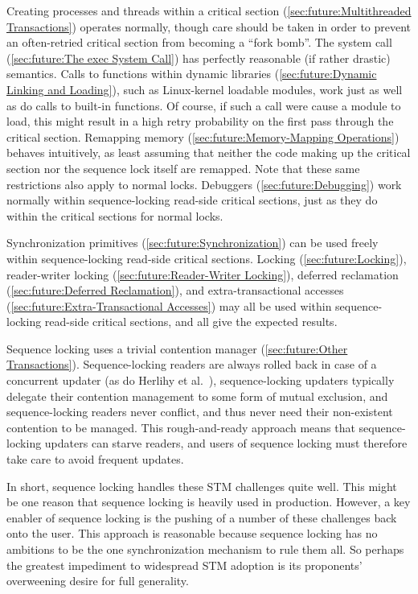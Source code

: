 Creating processes and threads within a critical section
(\cref{sec:future:Multithreaded Transactions})
operates normally, though care should be taken in order to prevent
an often-retried critical section from becoming a ``fork bomb''.
The  system call (\cref{sec:future:The exec System Call})
has perfectly reasonable (if rather drastic) semantics.
Calls to functions within dynamic libraries
(\cref{sec:future:Dynamic Linking and Loading}),
such as Linux-kernel loadable modules, work just as well as do calls
to built-in functions.
Of course, if such a call were cause a module to load, this might result
in a high retry probability on the first pass through the critical
section.
Remapping memory (\cref{sec:future:Memory-Mapping Operations})
behaves intuitively, as least assuming that neither the code making
up the critical section nor the sequence lock itself are remapped.
Note that these same restrictions also apply to normal locks.
Debuggers (\cref{sec:future:Debugging})
work normally within sequence-locking read-side critical sections,
just as they do within the critical sections for normal locks.

Synchronization primitives (\cref{sec:future:Synchronization})
can be used freely within sequence-locking read-side critical sections.
Locking (\cref{sec:future:Locking}),
reader-writer locking (\cref{sec:future:Reader-Writer Locking}),
deferred reclamation (\cref{sec:future:Deferred Reclamation}),
and extra-transactional accesses
(\cref{sec:future:Extra-Transactional Accesses})
may all be used within sequence-locking read-side critical sections,
and all give the expected results.

Sequence locking uses a trivial contention manager
(\cref{sec:future:Other Transactions}).
Sequence-locking readers are always rolled back in case of a concurrent
updater (as do Herlihy et al.~\cite{HerlihyLMS03}), sequence-locking
updaters typically delegate their contention management to some form of
mutual exclusion, and sequence-locking readers never conflict, and thus
never need their non-existent contention to be managed.
This rough-and-ready approach means that sequence-locking updaters
can starve readers, and users of sequence locking must therefore take
care to avoid frequent updates.

In short, sequence locking handles these STM challenges quite well.
This might be one reason that sequence locking is heavily used in
production.
However, a key enabler of sequence locking is the pushing of a number
of these challenges back onto the user.
This approach is reasonable because sequence locking has no ambitions
to be the one synchronization mechanism to rule them all.
So perhaps the greatest impediment to widespread STM adoption is its
proponents' overweening desire for full generality.

